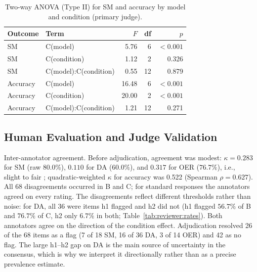 \documentclass[journal,article,submit,pdftex,moreauthors]{Definitions/mdpi}
\begin{document}
\begin{table}[H]
\caption{Two-way ANOVA (Type II) for SM and accuracy by model and condition (primary judge).}
\label{tab:models:anova}
\centering
\small
\begin{tabular}{llrrr}
\toprule
Outcome & Term & $F$ & df & $p$ \\
\midrule
SM & C(model) & 5.76 & 6 & $<0.001$ \\
SM & C(condition) & 1.12 & 2 & 0.326 \\
SM & C(model):C(condition) & 0.55 & 12 & 0.879 \\
Accuracy & C(model) & 16.48 & 6 & $<0.001$ \\
Accuracy & C(condition) & 20.00 & 2 & $<0.001$ \\
Accuracy & C(model):C(condition) & 1.21 & 12 & 0.271 \\
\bottomrule
\end{tabular}
\end{table}

\subsection{Human Evaluation and Judge Validation}
\label{sec:judgeval}

Inter-annotator agreement. Before adjudication, agreement was modest: $\kappa = 0.283$ for SM (raw $80.0\%$), $0.110$ for DA ($60.0\%$), and $0.317$ for OER ($76.7\%$), i.e., slight to fair \cite{landis1977measurement}; quadratic-weighted $\kappa$ for accuracy was 0.522 (Spearman $\rho = 0.627$). All 68 disagreements occurred in B and C; for standard responses the annotators agreed on every rating. The disagreements reflect different thresholds rather than noise: for DA, all 36 were items h1 flagged and h2 did not (h1 flagged $56.7\%$ of B and $76.7\%$ of C, h2 only $6.7\%$ in both; Table~\ref{tab:reviewer:rates}). Both annotators agree on the direction of the condition effect. Adjudication resolved 26 of the 68 items as a flag (7 of 18 SM, 16 of 36 DA, 3 of 14 OER) and 42 as no flag. The large h1--h2 gap on DA is the main source of uncertainty in the consensus, which is why we interpret it directionally rather than as a precise prevalence estimate.
\end{document}
